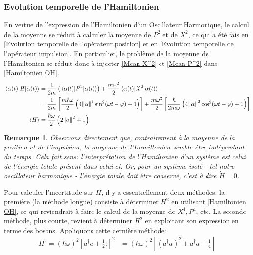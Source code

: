 \documentclass[11pt,oneside,a4paper]{article}
\newcommand{\h}{\ensuremath{\hbar}}
\newtheorem{remark}[theorem]{Remarque}
\begin{document}
\subsubsection{Evolution temporelle de l'Hamiltonien}

En vertue de l'expression de l'Hamiltonien d'un Oscillateur Harmonique, le calcul de la moyenne se réduit à calculer la moyenne de $P^2$ et de $X^2$, ce qui a été fais en \ref{Evolution temporelle de l'opérateur position} et en \ref{Evolution temporelle de l'opérateur impulsion}. En particulier, le problème de la moyenne de l'Hamiltonien se réduit donc à injecter \eqref{Mean X^2} et \eqref{Mean P^2} dans \eqref{Hamiltonien OH}.
\begin{align}
  \expval{H}{\alpha(t)} &= \frac{1}{2m}\left(\expval{P^2}{\alpha(t)}\right) + \frac{m\omega^2}{2}\expval{X^2}{\alpha(t)}\\
  &= \frac{1}{2m} \left[\frac{m\h\omega}{2}\left(4\norm{\alpha}^2\sin^2(\omega t-\varphi)+1\right)\right] + \frac{m\omega^2}{2}\left[\frac{\h}{2m\omega}\left(4\norm{\alpha}^2\cos^2(\omega t-\varphi)+1\right)\right]\\
  \expval{H} &= \frac{\h\omega}{2}\left(2\norm{\alpha}^2+1\right)\label{mean H}
\end{align}
\begin{remark}
  Observons directement que, contrairement à la moyenne de la position et de l'impulsion, la moyenne de l'Hamiltonien semble être indépendant du temps. Cela fait sens: l'interprétation de l'Hamiltonien d'un système est celui de l'énergie totale présent dans celui-ci. Or, pour un système isolé - tel notre oscillateur harmonique - l'énergie totale doit être conservé, c'est à dire $\dot{H} = 0$.
\end{remark}

Pour calculer l'incertitude sur $H$, il y a essentiellement deux méthodes: la première (la méthode longue) consiste à déterminer $H^2$ en utilisant \eqref{Hamiltonien OH}, ce qui reviendrait à faire le calcul de la moyenne de $X^4,P^4$, etc. La seconde méthode, plus courte, revient à déterminer $H^2$ en exploitant son expression en terme des bosons. Appliquons cette dernière méthode:
\begin{align}
  H^2 = \left(\h\omega\right)^2\left[a^\dagger a+\frac{1}{2}\mathbb{I}\right]^2 &= \left(\h\omega\right)^2\left[\left(a^\dagger a\right)^2+a^\dagger a+\frac{1}{4}\right]
\end{align}
\end{document}
